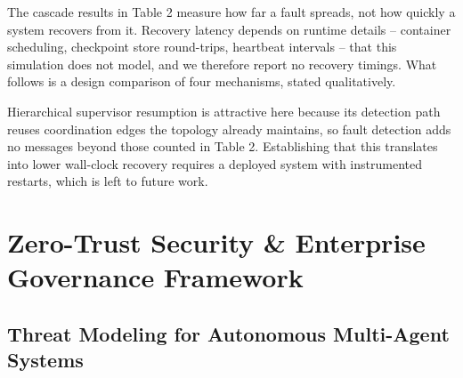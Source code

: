 \documentclass[10pt,journal,compsoc,twocolumn]{IEEEtran}
\begin{document}
The cascade results in Table 2 measure how far a fault spreads, not how quickly a system recovers from it. Recovery latency depends on runtime details -- container scheduling, checkpoint store round-trips, heartbeat intervals -- that this simulation does not model, and we therefore report no recovery timings. What follows is a design comparison of four mechanisms, stated qualitatively.
\begin{table}[htbp]
\centering
{}
\end{table}

Hierarchical supervisor resumption is attractive here because its detection path reuses coordination edges the topology already maintains, so fault detection adds no messages beyond those counted in Table 2. Establishing that this translates into lower wall-clock recovery requires a deployed system with instrumented restarts, which is left to future work.




\section{Zero-Trust Security \& Enterprise Governance Framework}



\subsection{Threat Modeling for Autonomous Multi-Agent Systems}
\end{document}
